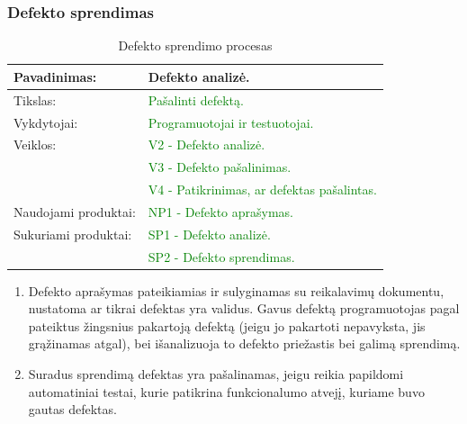 \documentclass{VUMIFPSkursinis}
\begin{document}
	\subsubsection{Defekto sprendimas}
	\begin{center}
		\begin{table}[ht]
			\caption{Defekto sprendimo procesas}
			\begin{tabular}{ | l | l | }
				\hline
				Pavadinimas:		& Defekto analizė.				\\ \hline
				Tikslas:		& \textcolor{green}{Pašalinti defektą.}				\\ \hline
				Vykdytojai:		&\textcolor{green}{ Programuotojai ir testuotojai.	}	\\ \hline
				Veiklos:		& \textcolor{green}{V2 - Defekto analizė.}				\\
							& \textcolor{green}{V3 - Defekto pašalinimas.}			\\
							& \textcolor{green}{V4 - Patikrinimas, ar defektas pašalintas.}	\\ \hline

				Naudojami produktai:	& \textcolor{green}{NP1 - Defekto aprašymas.}			\\ \hline
				Sukuriami produktai:	& \textcolor{green}{SP1 - Defekto analizė.	}		\\
							& \textcolor{green}{SP2 - Defekto sprendimas.}			\\ \hline
			\end{tabular}
		\end{table}
	\end{center}
	\begin{enumerate}
		\item{
			Defekto aprašymas pateikiamias ir sulyginamas su reikalavimų dokumentu, nustatoma ar tikrai defektas yra validus.
			Gavus defektą programuotojas pagal pateiktus žingsnius pakartoją defektą (jeigu jo pakartoti nepavyksta, jis grąžinamas atgal), bei išanalizuoja to defekto priežastis bei galimą sprendimą.}
		\item{
			Suradus sprendimą defektas yra pašalinamas, jeigu reikia papildomi automatiniai testai, kurie patikrina funkcionalumo atvejį, kuriame buvo gautas defektas.
		}
	\end{enumerate}
\end{document}
